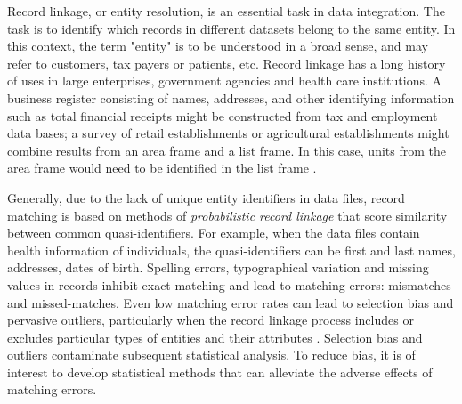 \documentclass[11pt]{article}
\begin{document}
Record linkage, or entity resolution, is an essential task in data integration. The task is to identify  which records in different datasets belong to the same entity. In this context, the term "entity" is to be understood in a broad sense, and may refer to customers, tax payers or patients, etc. Record linkage has a long history of uses in  large enterprises, government agencies and health care institutions. A business register consisting of names, addresses, and other identifying information such as total financial receipts might be constructed from tax and employment data bases; a survey of retail establishments or agricultural establishments might combine results from an area frame and a list frame. In this case, units from the area frame would need to be identified in the list frame \cite{Winkler14}. 
 
 
Generally, due to the lack of unique entity identifiers in data files, record matching is based on methods of \emph{probabilistic record linkage} \cite{Fellegi69} that score similarity  between common quasi-identifiers. For example, when the data files contain health information of individuals, the quasi-identifiers can be first and last names, addresses, dates of birth.  Spelling errors, typographical variation and missing values in records inhibit exact matching and lead to matching errors: mismatches and missed-matches.  Even low matching error rates can lead to selection bias and pervasive outliers, particularly when the record linkage process includes or excludes particular types of entities and their attributes \cite{Bohensky15}. Selection bias and outliers contaminate subsequent statistical analysis. To reduce bias, it is of interest to develop statistical methods that can alleviate the adverse effects of matching errors.    
\end{document}

